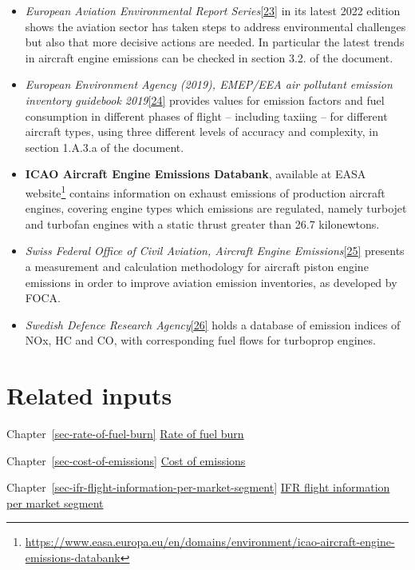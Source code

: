 \documentclass[
  11pt,
  a4paper,
]{book}
\DeclareRobustCommand{\href}[2]{#2\footnote{\url{#1}}}
\begin{document}
\begin{itemize}
\item
  \emph{European Aviation Environmental Report
  Series}\protect\hyperlink{ref-eaer2022}{{[}23{]}} in its latest 2022
  edition shows the aviation sector has taken steps to address
  environmental challenges but also that more decisive actions are
  needed. In particular the latest trends in aircraft engine emissions
  can be checked in section 3.2. of the document.
\item
  \emph{European Environment Agency (2019), EMEP/EEA air pollutant
  emission inventory guidebook
  2019}\protect\hyperlink{ref-eea:2019}{{[}24{]}} provides values for
  emission factors and fuel consumption in different phases of flight --
  including taxiing -- for different aircraft types, using three
  different levels of accuracy and complexity, in section 1.A.3.a of the
  document.
\item
  \textbf{ICAO Aircraft Engine Emissions Databank}, available at
  \href{https://www.easa.europa.eu/en/domains/environment/icao-aircraft-engine-emissions-databank}{EASA
  website} contains information on exhaust emissions of production
  aircraft engines, covering engine types which emissions are regulated,
  namely turbojet and turbofan engines with a static thrust greater than
  26.7 kilonewtons.
\item
  \emph{Swiss Federal Office of Civil Aviation, Aircraft Engine
  Emissions}\protect\hyperlink{ref-foca:aee}{{[}25{]}} presents a
  measurement and calculation methodology for aircraft piston engine
  emissions in order to improve aviation emission inventories, as
  developed by FOCA.
\item
  \emph{Swedish Defence Research
  Agency}\protect\hyperlink{ref-envimpact}{{[}26{]}} holds a database of
  emission indices of NOx, HC and CO, with corresponding fuel flows for
  turboprop engines.
\end{itemize}

\hypertarget{related-inputs-6}{%
\section{Related inputs}\label{related-inputs-6}}

Chapter~\ref{sec-rate-of-fuel-burn}
\protect\hyperlink{sec-rate-of-fuel-burn}{Rate of fuel burn}

Chapter~\ref{sec-cost-of-emissions}
\protect\hyperlink{sec-cost-of-emissions}{Cost of emissions}

Chapter~\ref{sec-ifr-flight-information-per-market-segment}
\protect\hyperlink{sec-ifr-flight-information-per-market-segment}{IFR
flight information per market segment}
\end{document}
